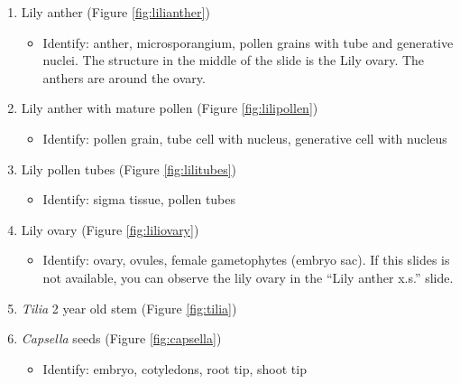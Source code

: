 \documentclass[]{book}
\providecommand{\tightlist}{%
  \setlength{\itemsep}{0pt}\setlength{\parskip}{0pt}}
\theoremstyle{definition}
\theoremstyle{definition}
\theoremstyle{definition}
\theoremstyle{remark}
\begin{document}
\begin{enumerate}
\def\labelenumi{\arabic{enumi}.}
\tightlist
\item
  Lily anther (Figure \ref{fig:lilianther})

  \begin{itemize}
  \tightlist
  \item
    Identify: anther, microsporangium, pollen grains with tube and
    generative nuclei. The structure in the middle of the slide is the
    Lily ovary. The anthers are around the ovary.
  \end{itemize}
\item
  Lily anther with mature pollen (Figure \ref{fig:lilipollen})

  \begin{itemize}
  \tightlist
  \item
    Identify: pollen grain, tube cell with nucleus, generative cell with
    nucleus
  \end{itemize}
\item
  Lily pollen tubes (Figure \ref{fig:lilitubes})

  \begin{itemize}
  \tightlist
  \item
    Identify: sigma tissue, pollen tubes
  \end{itemize}
\item
  Lily ovary (Figure \ref{fig:liliovary})

  \begin{itemize}
  \tightlist
  \item
    Identify: ovary, ovules, female gametophytes (embryo sac). If this
    slides is not available, you can observe the lily ovary in the
    ``Lily anther x.s.'' slide.
  \end{itemize}
\item
  \emph{Tilia} 2 year old stem (Figure \ref{fig:tilia})
\item
  \emph{Capsella} seeds (Figure \ref{fig:capsella})

  \begin{itemize}
  \tightlist
  \item
    Identify: embryo, cotyledons, root tip, shoot tip
  \end{itemize}
\end{enumerate}
\end{document}
